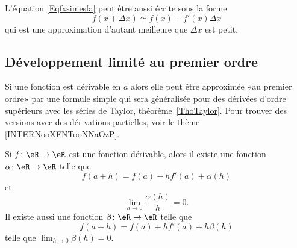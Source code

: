 L'équation \eqref{Eqfxsimesfa} peut être aussi écrite sous la forme
\begin{equation}		\label{EqfxdxSimeqfxfpx}
	f(x+\Delta x)\simeq f(x)+f'(x)\Delta x
\end{equation}
qui est une approximation d'autant meilleure que \( \Delta x\) est petit.

\subsection{Développement limité au premier ordre}

Si une fonction est dérivable en \( a\) alors elle peut être approximée «au premier ordre» par une formule simple qui sera généralisée pour des dérivées d'ordre supérieurs avec les séries de Taylor, théorème~\ref{ThoTaylor}. Pour trouver des versions avec des dérivations partielles, voir le thème \ref{INTERNooXFNTooNNaOzP}.
\begin{proposition}  \label{PropUTenzfQ}
	Si \( f\colon \eR\to \eR\) est une fonction dérivable, alors il existe une fonction \( \alpha\colon \eR\to \eR\) telle que
	\begin{equation}        \label{EQooHBDHooPrVjJD}
		f(a+h)=f(a)+hf'(a)+\alpha(h)
	\end{equation}
	et
	\begin{equation}
		\lim_{h\to 0} \frac{ \alpha(h) }{ h }=0.
	\end{equation}
	Il existe aussi une fonction \( \beta\colon \eR\to \eR\) telle que
	\begin{equation}        \label{EQooPWIZooVuhjmt}
		f(a+h)=f(a)+ hf'(a)+h\beta(h)
	\end{equation}
	telle que \( \lim_{h\to 0}\beta(h)=0\).
\end{proposition}


